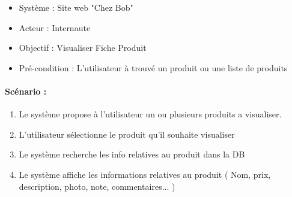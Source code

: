 \begin{boxedminipage}[t]{12cm}
  \begin{itemize}
		\item Système : Site web "Chez Bob"
		\item Acteur : Internaute
		\item Objectif : Visualiser Fiche Produit
		\item Pré-condition : L'utilisateur à trouvé un produit ou une liste de produits
	\end{itemize}

	\paragraph{Scénario : }
	\begin{enumerate}
		\item \label{sll1} Le système propose à l'utilisateur un ou plusieurs produits a visualiser.
		\item \label{sll2} L'utilisateur sélectionne le produit qu'il souhaite visualiser
		\item \label{sll3} Le système recherche les info relatives au produit dans la DB
		\item \label{sll4} Le système affiche les informations relatives au produit ( Nom, prix, description, photo, note, commentaires... )
	\end{enumerate}
\end{boxedminipage}